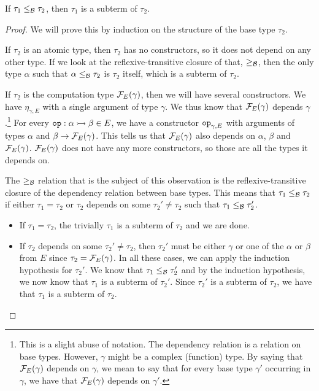 \begin{observation}
  If $\tau_1 \le_{\mathcal{B}} \tau_2$, then $\tau_1$ is a subterm of $\tau_2$.
\end{observation}
\begin{proof}
  We will prove this by induction on the structure of the base type
  $\tau_2$.

  If $\tau_2$ is an atomic type, then $\tau_2$ has no constructors, so it
  does not depend on any other type. If we look at the reflexive-transitive
  closure of that, $\ge_{\mathcal{B}}$, then the only type $\alpha$ such that
  $\alpha \le_{\mathcal{B}} \tau_2$ is $\tau_2$ itself, which is a subterm of
  $\tau_2$.
  
  If $\tau_2$ is the computation type $\mathcal{F}_E(\gamma)$, then we will have
  several constructors. We have $\eta_{\gamma,E}$ with a single argument of
  type $\gamma$. We thus know that $\mathcal{F}_E(\gamma)$ depends
  $\gamma$.\footnote{This is a slight abuse of notation. The dependency
    relation is a relation on base types. However, $\gamma$ might be a
    complex (function) type. By saying that $\mathcal{F}_E(\gamma)$ depends on
    $\gamma$, we mean to say that for every base type $\gamma'$ occurring
    in $\gamma$, we have that $\mathcal{F}_E(\gamma)$ depends on $\gamma'$.} For
  every $\mathtt{op} : \alpha \rightarrowtail \beta \in E$, we have a constructor
  $\mathtt{op}_{\gamma,E}$ with arguments of types $\alpha$ and
  $\beta \to \mathcal{F}_E(\gamma)$. This tells us that $\mathcal{F}_E(\gamma)$ also
  depends on $\alpha$, $\beta$ and $\mathcal{F}_E(\gamma)$. $\mathcal{F}_E(\gamma)$ does
  not have any more constructors, so those are all the types it depends on.

  The $\ge_{\mathcal{B}}$ relation that is the subject of this observation is the
  reflexive-transitive closure of the dependency relation between base
  types. This means that $\tau_1 \le_{\mathcal{B}} \tau_2$ if either
  $\tau_1 = \tau_2$ or $\tau_2$ depends on some $\tau_2' \neq \tau_2$ such
  that $\tau_1 \le_{\mathcal{B}} \tau_2'$.
  \begin{itemize}
  \item If $\tau_1 = \tau_2$, the trivially $\tau_1$ is a subterm of
    $\tau_2$ and we are done.
  \item If $\tau_2$ depends on some $\tau_2' \neq \tau_2$, then $\tau_2'$
    must be either $\gamma$ or one of the $\alpha$ or $\beta$ from $E$
    since $\tau_2 = \mathcal{F}_E(\gamma)$. In all these cases, we can apply the
    induction hypothesis for $\tau_2'$. We know that
    $\tau_1 \le_{\mathcal{B}} \tau_2'$ and by the induction hypothesis, we now know
    that $\tau_1$ is a subterm of $\tau_2'$. Since $\tau_2'$ is a subterm
    of $\tau_2$, we have that $\tau_1$ is a subterm of $\tau_2$.
  \end{itemize}
\end{proof}

